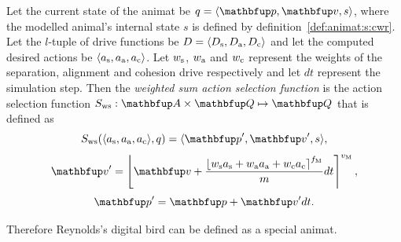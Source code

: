 \begin{definition}
\label{def:animat:Sws:cwr}
Let the current state of the animat be $q=\langle\vect{p},\vect{v},s\rangle$, where the modelled animal's internal state $s$ is defined by definition~\ref{def:animat:s:cwr}. Let the $l$-tuple of drive functions be $D=\langle D_\textnormal{s}, D_\textnormal{a}, D_\textnormal{c}\rangle$ and let the computed desired actions be $\langle a_\textnormal{s},a_\textnormal{a},a_\textnormal{c}\rangle$. Let $w_\textnormal{s}$, $w_\textnormal{a}$ and $w_\textnormal{c}$ represent the weights of the separation, alignment and cohesion drive respectively and let $dt$ represent the simulation step. Then the \emph{weighted sum action selection function} is the action selection function $S_\textnormal{ws}: \set{A} \times \set{Q} \mapsto \set{Q}$ that is defined as
\begin{equation}
S_\textnormal{ws}(\langle a_\textnormal{s},a_\textnormal{a},a_\textnormal{c}\rangle, q) = \langle\vect{p}', \vect{v}', s\rangle, \label{eq:animat:Sws0:cwr}
\end{equation}
\vspace{-3mm}
\begin{equation}
\vect{v}' = \left\lfloor {\vect{v} + \frac{\left\lfloor w_\textnormal{s}a_\textnormal{s} + w_\textnormal{a}a_\textnormal{a} + w_\textnormal{c}a_\textnormal{c} \right\rceil^{f_\textnormal{M}}}{m}}dt \right\rceil^{v_\textnormal{M}},
\end{equation}
\vspace{-3mm}
\begin{equation}
\vect{p}' = \vect{p} + \vect{v}'dt. \label{eq:animat:Sws2:cwr}
\end{equation}
\end{definition}

Therefore Reynolds's digital bird can be defined as a special animat. 

